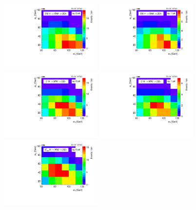 \begin{figure}[ht!] 
\centering 
\includegraphics[width=0.45\textwidth]{figures/2d_prefit_0j_125_sig_paper.pdf}
\includegraphics[width=0.45\textwidth]{figures/2d_prefit_1j_125_sig_paper.pdf}
\\
\includegraphics[width=0.45\textwidth]{figures/2d_prefit_0j_125_spin0m_paper.pdf}
\includegraphics[width=0.45\textwidth]{figures/2d_prefit_1j_125_spin0m_paper.pdf}
\\
\includegraphics[width=0.45\textwidth]{figures/2d_prefit_0j_125_spin2_paper.pdf}

\end{figure}
